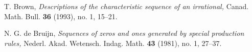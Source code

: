 \documentclass[11pt, letterpaper, reqno]{amsart}
\theoremstyle{definition}
\theoremstyle{remark}
\numberwithin{equation}{section}
\begin{document}
\begin{thebibliography}{99}










T. Brown,
\emph{Descriptions of the characteristic sequence of an irrational,}
Canad. Math. Bull. {\bf 36} (1993), no. 1, 15--21.

 
 
 N. G. de Bruijn,
\emph{Sequences of zeros and ones generated by special production rules,}
 Nederl. Akad. Wetensch. Indag. Math. {\bf 43} (1981), no. 1, 27--37.
  

\end{thebibliography}
\end{document}
